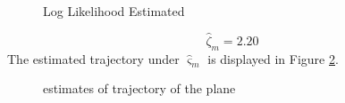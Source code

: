 \documentclass{article}
\begin{document}
\begin{figure}[h]
        \caption{\label{8} Log Likelihood Estimated}
    \end{figure}

\begin{equation}
    \hat \zeta_m =2.20
\end{equation}
The estimated trajectory under $\hat{\varsigma}_m$ is displayed in Figure \ref{8}.

\begin{figure}[h]
        \caption{\label{8} estimates of trajectory of the plane}
    \end{figure}
\end{document}
